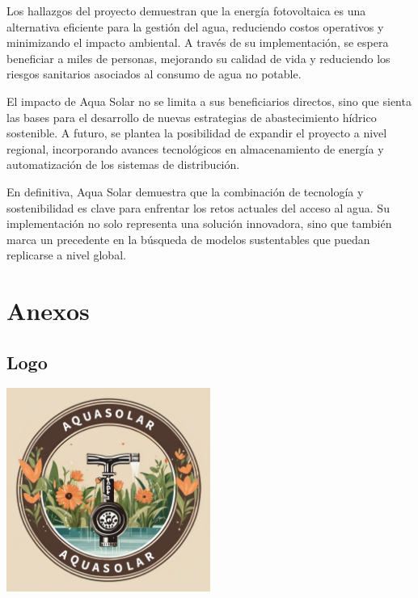 \documentclass[12pt]{article}
\begin{document}
Los hallazgos del proyecto demuestran que la energía fotovoltaica es una alternativa eficiente para la gestión del agua, reduciendo costos operativos y minimizando el impacto ambiental. A través de su implementación, se espera beneficiar a miles de personas, mejorando su calidad de vida y reduciendo los riesgos sanitarios asociados al consumo de agua no potable.

El impacto de Aqua Solar no se limita a sus beneficiarios directos, sino que sienta las bases para el desarrollo de nuevas estrategias de abastecimiento hídrico sostenible. A futuro, se plantea la posibilidad de expandir el proyecto a nivel regional, incorporando avances tecnológicos en almacenamiento de energía y automatización de los sistemas de distribución.

En definitiva, Aqua Solar demuestra que la combinación de tecnología y sostenibilidad es clave para enfrentar los retos actuales del acceso al agua. Su implementación no solo representa una solución innovadora, sino que también marca un precedente en la búsqueda de modelos sustentables que puedan replicarse a nivel global.

\newpage
\nocite{*}
\newpage
\section{Anexos}

\subsection{Logo}
\begin{center}
      \includegraphics[width=0.5\textwidth]{imagenes/logo.png}
\end{center}
\end{document}
